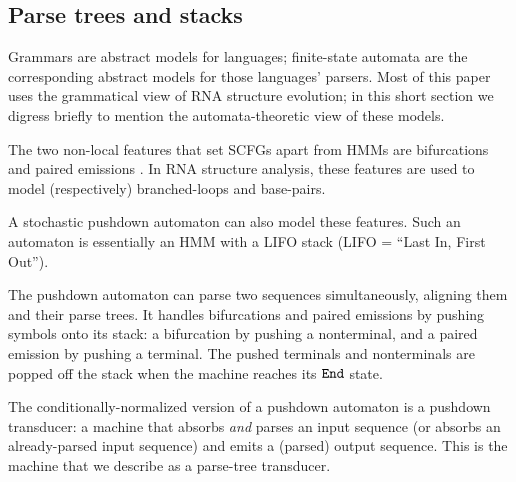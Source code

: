 \documentclass[10pt]{article}
\begin{document}
\subsection{Parse trees and stacks}

Grammars are abstract models for languages;
finite-state automata are the corresponding abstract models for those languages' parsers.
Most of this paper uses the grammatical view of RNA structure evolution;
in this short section we digress briefly to mention the automata-theoretic view of these models.

The two non-local features that set SCFGs apart from HMMs are bifurcations and paired emissions \cite{Durbin98}.
In RNA structure analysis, these features are used to model (respectively) branched-loops and base-pairs.

A stochastic pushdown automaton can also model these features.
Such an automaton is essentially an HMM with a LIFO stack (LIFO = ``Last In, First Out'').

The pushdown automaton can parse two sequences simultaneously, aligning them and their parse trees.
It handles bifurcations and paired emissions by pushing symbols onto its stack:
a bifurcation by pushing a nonterminal, and a paired emission by pushing a terminal.
The pushed terminals and nonterminals are popped off the stack when the machine reaches its $\mathtt{End}$ state.

The conditionally-normalized version of a pushdown automaton is a pushdown transducer:
a machine that absorbs {\em and} parses an input sequence (or absorbs an already-parsed input sequence)
and emits a (parsed) output sequence.
This is the machine that we describe as a parse-tree transducer.




\end{document}
